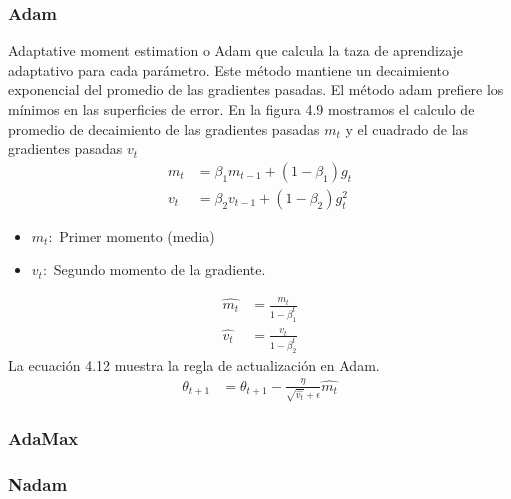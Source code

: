 \subsubsection{Adam	}
Adaptative moment estimation  o Adam que calcula la taza de aprendizaje adaptativo para cada parámetro. Este método mantiene un decaimiento exponencial del promedio de las gradientes pasadas. El método adam prefiere los mínimos en las superficies de error. En la figura 4.9 mostramos el calculo de promedio de decaimiento de las gradientes pasadas $m_{t}$ y el cuadrado de las gradientes pasadas $v_{t}$
\begin{equation}
\label{adam1}
\begin{aligned}
m_{t} &= \beta_{1} m_{t-1} +(1-\beta_{1})g_{t} \\
v_{t} &= \beta_{2} v_{t-1} +(1-\beta_{2})g_{t}^2
\end{aligned}
\end{equation}

\begin{itemize}
	\item $m_{t}:$ Primer momento (media)
	\item $v_{t}:$ Segundo momento de la gradiente.
\end{itemize}

\begin{equation}
\label{adam2}
\begin{aligned}
\hat{m_{t}}&= \frac{m_{t}}{1-\beta_{1}^{t}} \\
\hat{v_{t}} &= \frac{v_{t}}{1-\beta_{2}^{t}}
\end{aligned}
\end{equation}
La ecuación 4.12 muestra la regla de actualización en Adam.
\begin{equation}
\label{adam3}
\begin{aligned}
\theta_{t+1}&= \theta_{t+1} - \frac{\eta}{\sqrt{\hat{v_{t}}}+\epsilon} \hat{m_{t}}	
\end{aligned}
\end{equation}

\subsubsection{AdaMax}
\subsubsection{Nadam}